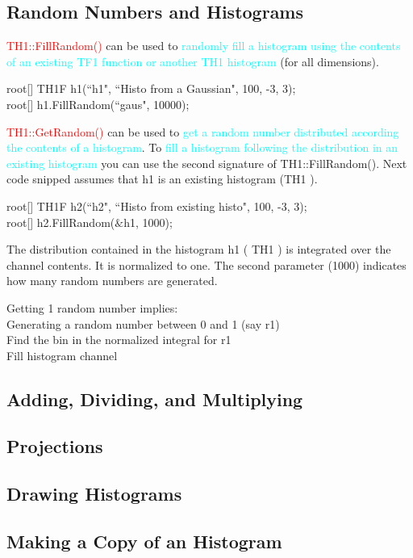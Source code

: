 \documentclass[12pt,a4paper]{article}
\begin{document}
\subsection{Random Numbers and Histograms}
\textcolor{red}{TH1::FillRandom()} can be used to \textcolor{cyan}{randomly fill a histogram using the contents of an existing TF1 function or another TH1 histogram} (for all dimensions).

root[] TH1F h1(``h1", ``Histo from a Gaussian", 100, -3, 3); \\
root[] h1.FillRandom(``gaus", 10000);

\textcolor{red}{TH1::GetRandom()} can be used to \textcolor{cyan}{get a random number distributed according the contents of a histogram}. To \textcolor{cyan}{fill a histogram following the distribution in an existing histogram} you can use the second signature of TH1::FillRandom(). Next code snipped assumes that h1 is an existing histogram (TH1 ).

root[] TH1F h2(``h2", ``Histo from existing histo", 100, -3, 3); \\
root[] h2.FillRandom($\&$h1, 1000);

The distribution contained in the histogram h1 ( TH1 ) is integrated over the channel contents. It is normalized to one. The second parameter (1000) indicates how many random numbers are generated.

Getting 1 random number implies: \\
Generating a random number between 0 and 1 (say r1) \\
Find the bin in the normalized integral for r1 \\
Fill histogram channel

\subsection{Adding, Dividing, and Multiplying}


\subsection{Projections}



\subsection{Drawing Histograms}


\subsection{Making a Copy of an Histogram}
\end{document}
